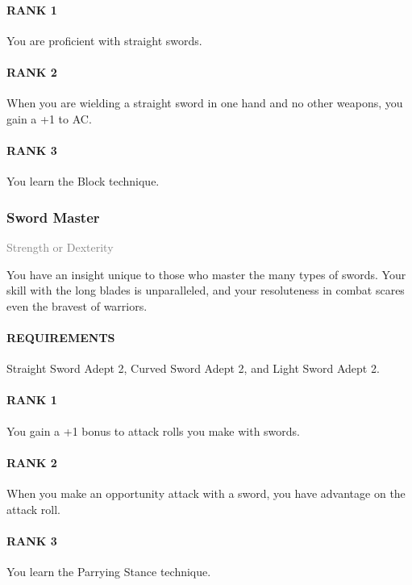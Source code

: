 \paragraph{RANK 1} You are proficient with straight swords.
\paragraph{RANK 2} When you are wielding a straight sword in one hand and no other weapons, you gain a +1 to AC.
\paragraph{RANK 3} You learn the Block technique.

\subsubsection{Sword Master} \label{feat::swordmaster}
\small{\textcolor{gray}{Strength or Dexterity}}

\normalsize
You have an insight unique to those who master the many types of swords.
Your skill with the long blades is unparalleled, and your resoluteness in combat scares even the bravest of warriors.
\paragraph{REQUIREMENTS} Straight Sword Adept 2, Curved Sword Adept 2, and Light Sword Adept 2.
\paragraph{RANK 1} You gain a +1 bonus to attack rolls you make with swords.
\paragraph{RANK 2} When you make an opportunity attack with a sword, you have advantage on the attack roll.
\paragraph{RANK 3} You learn the Parrying Stance technique.

